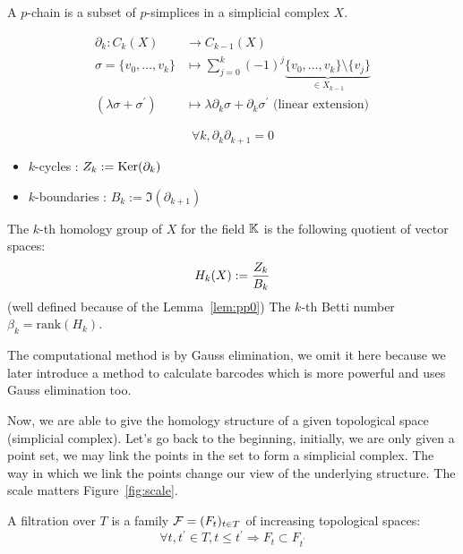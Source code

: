 \begin{definition}[$p$-chain]
  A $p$-chain is a subset of $p$-simplices in a simplicial complex $X$.
\end{definition}

\begin{definition}
  $$
  \begin{aligned}
  \partial_k: C_k(X) & \to C_{k-1}(X) \\
  \sigma=\{ v_0, \ldots, v_k \} & \mapsto \sum_{j=0}^k(-1)^j \underbrace{ \{v_0,\ldots,v_k \} \setminus \{v_j\}}_{\in X_{k-1}} \\
  \left(\lambda \sigma+\sigma^{\prime}\right) & \mapsto \lambda \partial_k \sigma+\partial_k \sigma^{\prime} \text{ (linear extension)}
  \end{aligned}
  $$
\end{definition}

\begin{lemma}
  $$
  \forall k, \partial_k \partial_{k+1} = 0
  $$
  \label{lem:pp0}
\end{lemma}

\begin{definition}
  \begin{itemize}
    \item $k$-cycles : $Z_k:=\operatorname{Ker}(\partial_k)$
    \item $k$-boundaries : $B_k:=\Im(\partial_{k+1})$
  \end{itemize}
  The $k$-th homology group of $X$ for the field $\mathbb{K}$ is the following quotient
  of vector spaces:
  $$
  H_k(X):={Z_k\over B_k}
  $$
  (well defined because of the Lemma~\ref{lem:pp0})
  The $k$-th Betti number $\beta_k = \mathrm{rank}(H_k)$.
\end{definition}
\RM The computational method is by Gauss elimination, we omit it here
because we later introduce a method to calculate barcodes which is more
powerful and uses Gauss elimination too.

Now, we are able to give the homology structure of a given topological space (simplicial complex).
Let's go back to the beginning, initially, we are only given a point set,
we may link the points in the set to form a simplicial complex.
The way in which we link the points change our view of the underlying structure.
The scale matters Figure~\ref{fig:scale}.


\begin{definition}[Filtration]
  A filtration over $T$ is a family $\mathcal{F} = (F_t)_{t\in T}$ of increasing topological spaces:
  $$
  \forall t, t^{\prime} \in T, t \leqslant t^{\prime} \Rightarrow F_t \subset F_{t^{\prime}}
  $$
\end{definition}

